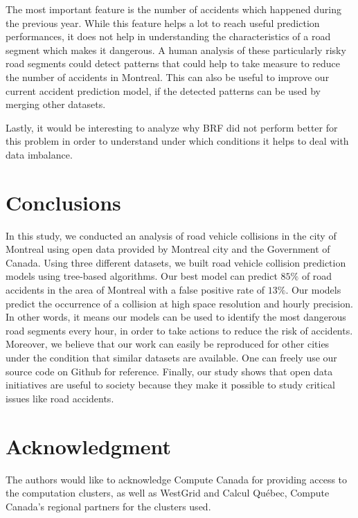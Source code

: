 \documentclass[conference]{IEEEtran}
\begin{document}
The most important feature is the number of accidents which happened during
the previous year. While this feature helps a lot to reach useful prediction
performances, it does not help in understanding the characteristics of a
road segment which makes it dangerous. A human analysis of these
particularly risky road segments could detect patterns that could help to
take measure to reduce the number of accidents in Montreal. This can also
be useful to improve our current accident prediction model, if the detected
patterns can be used by merging other datasets.

Lastly, it would be interesting to analyze why BRF did not perform better for this problem in order to understand under which conditions it helps to deal with data imbalance.

\section{Conclusions}

In this study, we conducted an analysis of road vehicle collisions in the
city of Montreal using open data provided by Montreal city and the Government of Canada. 
Using three different datasets, we built road vehicle collision
prediction models using tree-based algorithms. Our best model can predict $85\%$ of road accidents in the area of Montreal with a false positive rate of $13\%$.
Our models predict the occurrence of a collision at high space resolution and hourly precision. In other words, it
means our models can be used to identify the most dangerous road
segments every hour, in order to take actions to reduce the risk of accidents. 
Moreover, we believe that our work
can easily be reproduced for other cities under the condition that similar 
datasets are available. One can freely use our source code on Github for reference.
Finally, our study shows that open data initiatives are useful to society because they make it possible to study critical issues like road
accidents.


\section*{Acknowledgment}

The authors would like to acknowledge Compute Canada for providing access to the computation clusters, as well as WestGrid and Calcul Québec, Compute Canada's regional partners for the clusters used.



\end{document}
